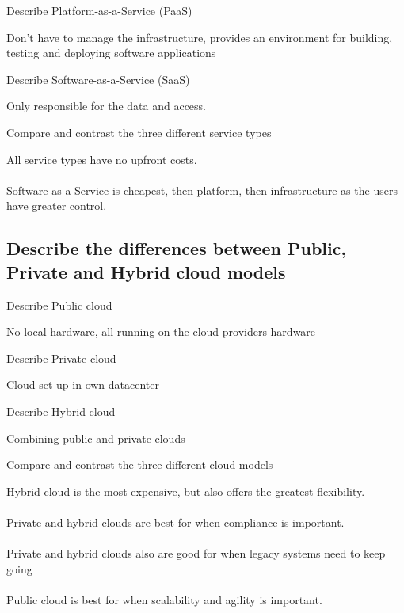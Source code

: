 \documentclass[addpoints]{exam}
\begin{document}
\begin{questions}
\question Describe Platform-as-a-Service (PaaS)
\begin{solution}[2in]
	Don't have to manage the infrastructure, provides an environment for building, testing and deploying software applications
\end{solution}

\question Describe Software-as-a-Service (SaaS)
\begin{solution}[2in]
	Only responsible for the data and access.
\end{solution}

\question Compare and contrast the three different service types
\begin{solution}[2in]
	All service types have no upfront costs.\\
	\\
	Software as a Service is cheapest, then platform, then infrastructure as the users have greater control.
\end{solution}
\subsection{Describe the differences between Public, Private and Hybrid cloud models}
\question Describe Public cloud
\begin{solution}[2in]
	No local hardware, all running on the cloud providers hardware
\end{solution}

\question Describe Private cloud
\begin{solution}[2in]
	Cloud set up in own datacenter
\end{solution}

\question Describe Hybrid cloud
\begin{solution}[2in]
	Combining public and private clouds
\end{solution}

\question Compare and contrast the three different cloud models
\begin{solution}[2in]
	Hybrid cloud is the most expensive, but also offers the greatest flexibility.\\
	\\
	Private and hybrid clouds are best for when compliance is important.\\
	\\
	Private and hybrid clouds also are good for when legacy systems need to keep going\\
	\\
	Public cloud is best for when scalability and agility is important.
\end{solution}


\end{questions}
\end{document}
